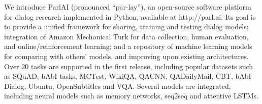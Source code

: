 We introduce ParlAI (pronounced ``par-lay''), an open-source software platform for dialog research implemented in Python, available at http://parl.ai. Its goal is to provide a unified framework for sharing, training and testing dialog models; integration of Amazon Mechanical Turk for data collection, human evaluation, and online/reinforcement learning; and a repository of machine learning models for comparing with others' models, and improving upon existing architectures. Over 20 tasks are supported in the first release, including popular datasets such as SQuAD, bAbI tasks, MCTest, WikiQA, QACNN, QADailyMail, CBT, bAbI Dialog, Ubuntu, OpenSubtitles and VQA. Several models are integrated, including neural models such as memory networks, seq2seq and attentive LSTMs.
